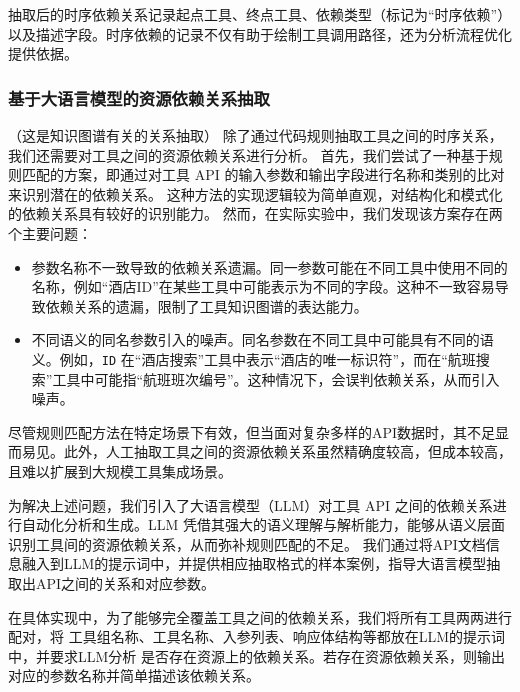 抽取后的时序依赖关系记录起点工具、终点工具、依赖类型（标记为“时序依赖”）以及描述字段。时序依赖的记录不仅有助于绘制工具调用路径，还为分析流程优化提供依据。

\subsubsection{基于大语言模型的资源依赖关系抽取}

（这是知识图谱有关的关系抽取）
除了通过代码规则抽取工具之间的时序关系，我们还需要对工具之间的资源依赖关系进行分析。
首先，我们尝试了一种基于规则匹配的方案，即通过对工具 API 的输入参数和输出字段进行名称和类别的比对来识别潜在的依赖关系。
这种方法的实现逻辑较为简单直观，对结构化和模式化的依赖关系具有较好的识别能力。
然而，在实际实验中，我们发现该方案存在两个主要问题：

\begin{itemize}
    \item 参数名称不一致导致的依赖关系遗漏。同一参数可能在不同工具中使用不同的名称，例如“酒店ID”在某些工具中可能表示为不同的字段。这种不一致容易导致依赖关系的遗漏，限制了工具知识图谱的表达能力。
    \item 不同语义的同名参数引入的噪声。同名参数在不同工具中可能具有不同的语义。例如，\texttt{ID} 在“酒店搜索”工具中表示“酒店的唯一标识符”，而在“航班搜索”工具中可能指“航班班次编号”。这种情况下，会误判依赖关系，从而引入噪声。
\end{itemize}

尽管规则匹配方法在特定场景下有效，但当面对复杂多样的API数据时，其不足显而易见。此外，人工抽取工具之间的资源依赖关系虽然精确度较高，但成本较高，且难以扩展到大规模工具集成场景。

为解决上述问题，我们引入了大语言模型（LLM）对工具 API 之间的依赖关系进行自动化分析和生成。LLM 凭借其强大的语义理解与解析能力，能够从语义层面识别工具间的资源依赖关系，从而弥补规则匹配的不足。
我们通过将API文档信息融入到LLM的提示词中，并提供相应抽取格式的样本案例，指导大语言模型抽取出API之间的关系和对应参数。

在具体实现中，为了能够完全覆盖工具之间的依赖关系，我们将所有工具两两进行配对，将
工具组名称、工具名称、入参列表、响应体结构等都放在LLM的提示词中，并要求LLM分析
是否存在资源上的依赖关系。若存在资源依赖关系，则输出对应的参数名称并简单描述该依赖关系。


